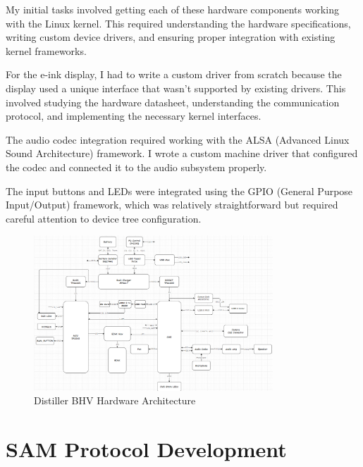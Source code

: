 \documentclass[12pt,a4paper]{report}
\begin{document}
\vspace{0.3cm}

My initial tasks involved getting each of these hardware components working with the Linux kernel. This required understanding the hardware specifications, writing custom device drivers, and ensuring proper integration with existing kernel frameworks.

\vspace{0.3cm}

For the e-ink display, I had to write a custom driver from scratch because the display used a unique interface that wasn't supported by existing drivers. This involved studying the hardware datasheet, understanding the communication protocol, and implementing the necessary kernel interfaces.

\vspace{0.3cm}

The audio codec integration required working with the ALSA (Advanced Linux Sound Architecture) framework. I wrote a custom machine driver that configured the codec and connected it to the audio subsystem properly.

\vspace{0.3cm}

The input buttons and LEDs were integrated using the GPIO (General Purpose Input/Output) framework, which was relatively straightforward but required careful attention to device tree configuration.

\begin{figure}[h]
    \centering
    \includegraphics[width=0.8\textwidth]{bhv_hardware_architecture.png}
    \caption{Distiller BHV Hardware Architecture}
\end{figure}

\section{SAM Protocol Development}
\end{document}
